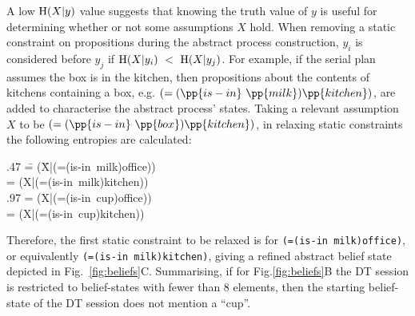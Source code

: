 A low $\mathrm{H}(X|y)$ value suggests that knowing the truth value of
$y$ is useful for determining whether or not some assumptions $X$
hold. When removing a static constraint on propositions during the
abstract process construction, $y_i$ is considered before $y_j$ if
$\mathrm{H}(X|y_i)~<~\mathrm{H}(X|y_j)$. For example, if the serial plan
assumes the box is in the kitchen, then propositions about the
contents of kitchens containing a box,
e.g. $(=(\pp{is-in}~\pp{milk})\pp{kitchen})$, are added to
characterise the abstract process' states. Taking a relevant
assumption $X$ to be $(=(\pp{is-in}~\pp{box})\pp{kitchen})$, in
relaxing static constraints the following entropies are calculated:

\small
\begin{tabtt}
.47 \= = \entropy(\=X|(=(is-in~milk)office))\+ \\
 = \entropy(X|(=(is-in~milk)kitchen)) \-\\
.97 = \entropy(X|(=(is-in~cup)office))\+\\
 = \entropy(X|(=(is-in~cup)kitchen))
\end{tabtt}
\normalsize

\noindent Therefore, the first static constraint to be relaxed is for
\texttt{(=(is-in~milk)office)}, or
equivalently \texttt{(=(is-in~milk)kitchen)}, giving a refined
abstract belief state depicted in
Fig.~\ref{fig:beliefs}C. Summarising, if for Fig.\ref{fig:beliefs}B
the DT session is restricted to belief-states with fewer than $8$
elements, then the starting belief-state of the DT session does not
mention a ``cup''.


